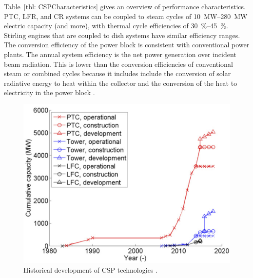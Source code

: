 Table~\ref{tbl: CSPCharacteristics} gives an overview of performance characteristics. \ac{PTC}, \ac{LFR}, and \ac{CR} systems can be coupled to steam cycles of \SIrange{10}{280}{\mega\watt} electric capacity (and more), with thermal cycle efficiencies of \SIrange{30}{45}{\percent}. Stirling engines that are coupled to dish systems have similar efficiency ranges. The conversion efficiency of the power block is consistent with conventional power plants. The annual system efficiency is the net power generation over incident beam radiation. This is lower than the conversion efficiencies of conventional steam or combined cycles because it includes include the conversion of solar radiative energy to heat within the collector and the conversion of the heat to electricity in the power block \cite{Pitz-Paal.2013}.

\begin{figure}[!h] 
\centering
\includegraphics[width=0.65\linewidth]{FIG/CSP_technology_development}
\caption[Historical development of CSP technologies.]{Historical development of CSP technologies \cite{Abbas2015}.}\label{CSP_technology_development}
\end{figure}

